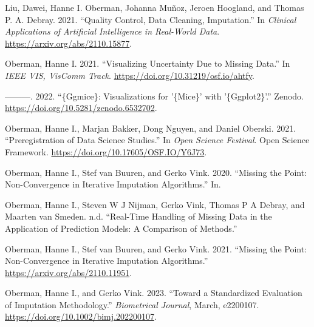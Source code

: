 \documentclass[
  letterpaper,
  DIV=11,
  numbers=noendperiod,
  oneside]{scrartcl}
\newlength{\cslhangindent}
\newlength{\cslentryspacingunit} %
\newenvironment{CSLReferences}[2] %
 {%
  \setlength{\parindent}{0pt}
  \ifodd #1
  \let\oldpar\par
  \def\par{\hangindent=\cslhangindent\oldpar}
  \fi
  \setlength{\parskip}{#2\cslentryspacingunit}
 }%
 {}
\begin{document}
\hypertarget{refs}{}
\begin{CSLReferences}{1}{0}
\leavevmode{}%
Liu, Dawei, Hanne I. Oberman, Johanna Muñoz, Jeroen Hoogland, and Thomas
P. A. Debray. 2021. {``Quality Control, Data Cleaning, Imputation.''} In
\emph{Clinical Applications of Artificial Intelligence in Real-World
Data}. \url{https://arxiv.org/abs/2110.15877}.

\leavevmode{}%
Oberman, Hanne I. 2021. {``Visualizing Uncertainty Due to Missing
Data.''} In \emph{{IEEE VIS}, {VisComm} Track}.
\url{https://doi.org/10.31219/osf.io/ahtfy}.

\leavevmode{}%
---------. 2022. {``\{Ggmice\}: {Visualizations} for '\{Mice\}' with
'\{Ggplot2\}'.''} Zenodo. \url{https://doi.org/10.5281/zenodo.6532702}.

\leavevmode{}%
Oberman, Hanne I., Marjan Bakker, Dong Nguyen, and Daniel Oberski. 2021.
{``Preregistration of Data Science Studies.''} In \emph{Open {Science
Festival}}. {Open Science Framework}.
\url{https://doi.org/10.17605/OSF.IO/Y6J73}.

\leavevmode{}%
Oberman, Hanne I., Stef van Buuren, and Gerko Vink. 2020. {``Missing the
{Point}: {Non-Convergence} in {Iterative Imputation Algorithms}.''} In.

\leavevmode{}%
Oberman, Hanne I., Steven W J Nijman, Gerko Vink, Thomas P A Debray, and
Maarten van Smeden. n.d. {``Real-Time Handling of Missing Data in the
Application of Prediction Models: A Comparison of Methods.''}

\leavevmode{}%
Oberman, Hanne I., Stef van Buuren, and Gerko Vink. 2021. {``Missing the
{Point}: {Non-Convergence} in {Iterative Imputation Algorithms}.''}
\url{https://arxiv.org/abs/2110.11951}.

\leavevmode{}%
Oberman, Hanne I., and Gerko Vink. 2023. {``Toward a Standardized
Evaluation of Imputation Methodology.''} \emph{Biometrical Journal},
March, e2200107. \url{https://doi.org/10.1002/bimj.202200107}.

\end{CSLReferences}
\end{document}
